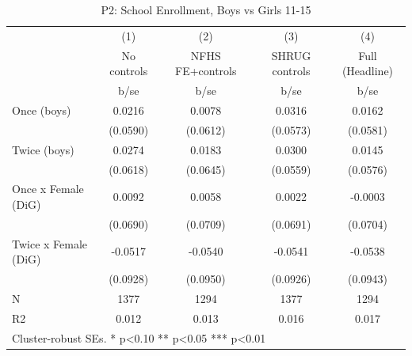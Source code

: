 \begin{table}[htbp]\centering
\def\sym#1{\ifmmode^{#1}\else\(^{#1}\)\fi}
\caption{P2: School Enrollment, Boys vs Girls 11-15}
\begin{tabular}{l*{4}{c}}
\toprule
            &\multicolumn{1}{c}{(1)}   &\multicolumn{1}{c}{(2)}   &\multicolumn{1}{c}{(3)}   &\multicolumn{1}{c}{(4)}   \\
            & No controls   &NFHS FE+controls   &SHRUG controls   &Full (Headline)   \\
            &        b/se   &        b/se   &        b/se   &        b/se   \\
\midrule
Once (boys) &      0.0216   &      0.0078   &      0.0316   &      0.0162   \\
            &    (0.0590)   &    (0.0612)   &    (0.0573)   &    (0.0581)   \\
Twice (boys)&      0.0274   &      0.0183   &      0.0300   &      0.0145   \\
            &    (0.0618)   &    (0.0645)   &    (0.0559)   &    (0.0576)   \\
Once x Female (DiG)&      0.0092   &      0.0058   &      0.0022   &     -0.0003   \\
            &    (0.0690)   &    (0.0709)   &    (0.0691)   &    (0.0704)   \\
Twice x Female (DiG)&     -0.0517   &     -0.0540   &     -0.0541   &     -0.0538   \\
            &    (0.0928)   &    (0.0950)   &    (0.0926)   &    (0.0943)   \\
\midrule
N           &        1377   &        1294   &        1377   &        1294   \\
R2          &       0.012   &       0.013   &       0.016   &       0.017   \\
\bottomrule
\multicolumn{5}{l}{\footnotesize Cluster-robust SEs. * p<0.10 ** p<0.05 *** p<0.01}\\
\end{tabular}
\end{table}
